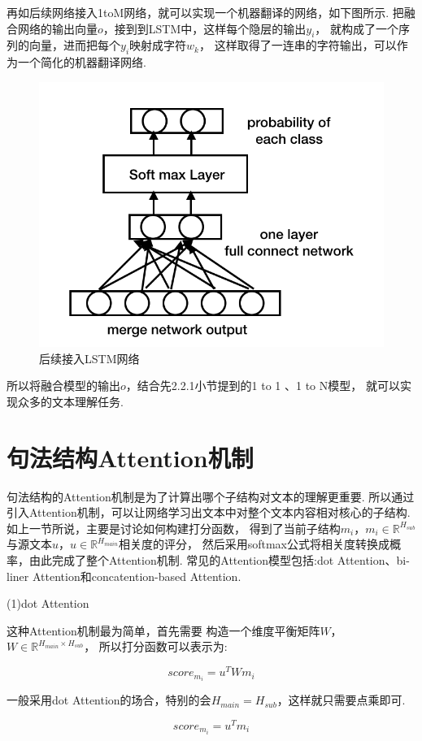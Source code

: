 \documentclass[bachelor,adobefonts]{jnuthesis}
\begin{document}
再如后续网络接入1toM网络，就可以实现一个机器翻译的网络，如下图所示.
把融合网络的输出向量$o$，接到到LSTM中，这样每个隐层的输出$y_{i}$，
就构成了一个序列的向量，进而把每个$y_{i}$映射成字符$w_{k}$，
这样取得了一连串的字符输出，可以作为一个简化的机器翻译网络.

\begin{figure}[h!]
  \centering
  \includegraphics[width=0.5\linewidth]{erfenlei.png}
  \caption{后续接入LSTM网络}
\end{figure}

所以将融合模型的输出$o$，结合先2.2.1小节提到的1 to 1 、1 to N模型，
就可以实现众多的文本理解任务. 

\section{句法结构Attention机制}
句法结构的Attention机制是为了计算出哪个子结构对文本的理解更重要.
所以通过引入Attention机制，可以让网络学习出文本中对整个文本内容相对核心的子结构.
如上一节所说，主要是讨论如何构建打分函数，
得到了当前子结构$m_{i}$，$m_{i} \in \mathbb{R}^{H_{sub}}$与源文本$u$，$u \in \mathbb{R}^{H_{main}}$相关度的评分，
然后采用softmax公式将相关度转换成概率，由此完成了整个Attention机制.
常见的Attention模型包括:dot Attention、bi-liner Attention和concatention-based Attention.

(1)dot Attention

这种Attention机制最为简单，首先需要
构造一个维度平衡矩阵$W$，$W \in \mathbb{R}^{H_{main} \times H_{sub}}$，
所以打分函数可以表示为:

\begin{equation}
  score_{m_{i}} = u^{T}Wm_{i}
\end{equation}

一般采用dot Attention的场合，特别的会$H_{main} = H_{sub}$，这样就只需要点乘即可.

\begin{equation}
  score_{m_{i}} = u^{T}m_{i}
\end{equation}
\end{document}
